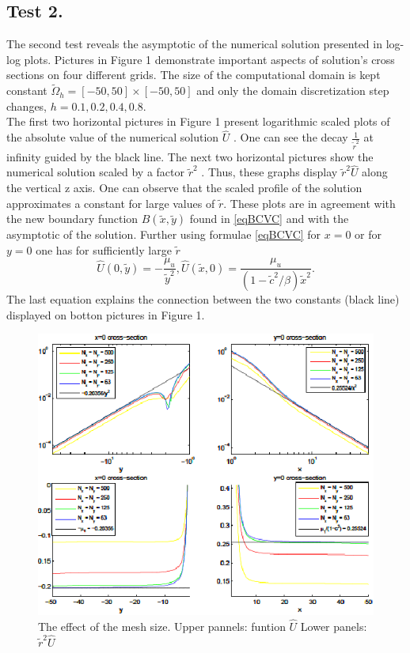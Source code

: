 \documentclass[12pt]{article}
\theoremstyle{theorem}
\theoremstyle{defi}
\begin{document}
\subsection{Test 2.}
The second test reveals the asymptotic of the numerical solution presented in log-log plots. Pictures in Figure 1 demonstrate important aspects of solution's cross sections on four different grids. The size of the computational domain is kept constant  $\tilde \Omega_h = [-50, 50]\times[-50, 50]$ and only the domain discretization step changes, $h = 0.1, 0.2, 0.4, 0.8$. 
\\
The first two horizontal pictures in Figure 1 present logarithmic scaled plots of the absolute value of the numerical solution $\widehat{U}$  . One can see the decay $\frac{1}{\tilde r^2}$  at infinity guided by the black line. The next two horizontal pictures show the numerical solution scaled by a factor $\tilde r^2$  . Thus, these graphs display  $\tilde r^2\widehat{U}$  along the vertical z axis. One can observe that the scaled profile of the solution approximates a constant for large values of $ \tilde r$.  These plots are in agreement with the new boundary function $B(\tilde{x} , \tilde y)$ found in \eqref{eqBCVC} and with the asymptotic of the solution. Further using formulae \eqref{eqBCVC}  for $x = 0$ or for $y = 0$ one has for sufficiently large $ \tilde r $
$$
\widehat{U}(0,\tilde y) = - \frac{\mu_u}{\tilde y^2}, \widehat{U}(\tilde x,0) = \frac{\mu_u}{(1 - \tilde c^2/\beta )\tilde x^2}.
$$
The last equation explains the connection between the two constants (black line) displayed on botton pictures in Figure 1.

\begin{figure}[htbp]
        \centering
              \includegraphics[width=0.98\linewidth]{figure1.eps}   
        \caption{The effect of the mesh size. Upper pannels: funtion $\widehat{U}$  Lower panels: $\tilde r^2 \widehat{U}$  }
	\label{fig1}
\end{figure}
\end{document}
